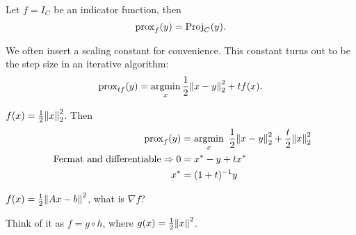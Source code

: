 \documentclass[class=article,crop=false]{standalone}
\begin{document}
\begin{eg}
Let $ f = I_C$ be an indicator function, then
 \[
	 \operatorname{prox}_f(y) = \operatorname{Proj}_C(y)
.\] 
\end{eg}
\begin{remark}
We often insert a scaling constant for convenience. This constant turns out to be the step size in an iterative algorithm:
\[
	\operatorname{prox}_{tf}(y) = \operatorname*{argmin}_x \frac{1}{2}{\left\lVert{ x-y}\right\rVert}_2 ^2 + t f(x)
.\] 
\end{remark}
\begin{eg}
	$ f(x) = \frac{1}{2} {\left\lVert{ x}\right\rVert}_2^2 $. Then
	\begin{align*}
		\operatorname{prox}_f(y) &= \operatorname*{argmin}_x \ \frac{1}{2} {\left\lVert{ x-y}\right\rVert}_2 ^2 + \frac{t}{2} {\left\lVert{ x}\right\rVert}_2 ^2\\
		\text{ Fermat and differentiable}\Rightarrow 0 &= x^* -y + tx^*  \\
		x^*  &= (1+t)^{-1} y
	\end{align*}
\end{eg}
\begin{eg}
	$ f(x) = \frac{1}{2} {\left\lVert{ Ax-b}\right\rVert}^2 $, what is $ \nabla f$?

	Think of it as $ f = g \circ h$, where  $ g(x) = \frac{1}{2} {\left\lVert{ x}\right\rVert}^2 $. 
\end{eg}
\end{document}
